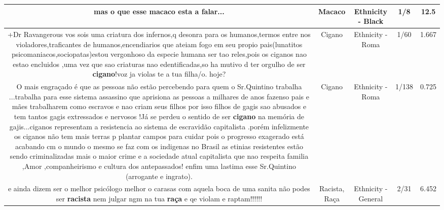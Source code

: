 \documentclass[11pt]{article}
\newlength\mylength
\begin{document}
\begin{center}
\begin{longtable}{|C{.65\mylength}|C{.30\mylength}|C{.12\mylength}|C{.12\mylength}|C{.12\mylength}|}
  \small mas o que esse \textbf{macaco} esta a falar...\normalsize   & Macaco & Ethnicity - Black & 1/8 & 12.5 \\  \hline
  \small +Dr Ravangerous vos sois uma criatura dos infernos,q desonra para os humanos,termos entre nos violadores,traficantes de humanos,encendiarios que ateiam fogo em seu propio pais(lunatitos psicomaniacos,sociopatas)estou vergonhoso da especie humana ser tao reles,pois os ciganos nao estao encluidos ,uma vez que sao criaturas nao edentificadas,so ha mutivo d ter orgulho de ser \textbf{cigano}!voz ja violas te a tua filha/o. hoje?\normalsize   & Cigano & Ethnicity - Roma & 1/60 & 1.667 \\  \hline
  \small O mais engraçado é que as pessoas não estão percebendo para quem o Sr.Quintino trabalha ...trabalha para esse sistema assassino que aprisiona as pessoas a milhares de anos fazenso pais e mães trabalharem como escravos e nao criam seus filhos por isso filhos de gagis sao abusados e tem tantos gagis extressados e nervosos !Já se perdeu o sentido de ser \textbf{cigano} na memória de gajis...ciganos representam a resistencia ao sistema de escravidão capitalista .porém infelizmente os ciganos não tem mais terras p plantar campos para cuidar pois o progresso exagerado está acabando cm o mundo o mesmo se faz com os indigenas no Brasil as etinias resistentes estão sendo criminalizadas mais o maior crime e a sociedade atual capitalista que nao respeita familia ,Amor ,companheirismo  e cultura dos antepassados! enfim uma lastima esse Sr.Quintino (arrogante e ingrato).\normalsize   & Cigano & Ethnicity - Roma & 1/138 & 0.725 \\  \hline
  \small e ainda dizem ser o melhor psicólogo melhor o carasas com aquela boca de uma sanita não podes ser \textbf{racista} nem julgar ngm na tua \textbf{raça} e qe violam e raptam!!!!!!\normalsize   & Racista, Raça & Ethnicity - General & 2/31 & 6.452 \\  \hline

\end{longtable}
\end{center}
\end{document}
